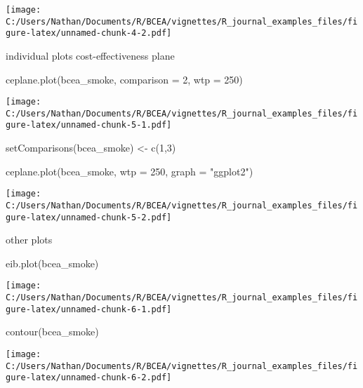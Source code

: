 \documentclass[
]{article}
\newenvironment{Shaded}{\begin{snugshade}}{\end{snugshade}}
\newcommand{\AttributeTok}[1]{\textcolor[rgb]{0.77,0.63,0.00}{#1}}
\newcommand{\DecValTok}[1]{\textcolor[rgb]{0.00,0.00,0.81}{#1}}
\newcommand{\FunctionTok}[1]{\textcolor[rgb]{0.00,0.00,0.00}{#1}}
\newcommand{\NormalTok}[1]{#1}
\newcommand{\OtherTok}[1]{\textcolor[rgb]{0.56,0.35,0.01}{#1}}
\newcommand{\StringTok}[1]{\textcolor[rgb]{0.31,0.60,0.02}{#1}}
\begin{document}
\texttt{[image: C:/Users/Nathan/Documents/R/BCEA/vignettes/R\_journal\_examples\_files/figure-latex/unnamed-chunk-4-2.pdf]}

individual plots cost-effectiveness plane

\begin{Shaded}
\begin{Highlighting}[]
\FunctionTok{ceplane.plot}\NormalTok{(bcea\_smoke, }\AttributeTok{comparison =} \DecValTok{2}\NormalTok{, }\AttributeTok{wtp =} \DecValTok{250}\NormalTok{)}
\end{Highlighting}
\end{Shaded}

\texttt{[image: C:/Users/Nathan/Documents/R/BCEA/vignettes/R\_journal\_examples\_files/figure-latex/unnamed-chunk-5-1.pdf]}

\begin{Shaded}
\begin{Highlighting}[]

\FunctionTok{setComparisons}\NormalTok{(bcea\_smoke) }\OtherTok{\textless{}{-}} \FunctionTok{c}\NormalTok{(}\DecValTok{1}\NormalTok{,}\DecValTok{3}\NormalTok{)}

\FunctionTok{ceplane.plot}\NormalTok{(bcea\_smoke, }\AttributeTok{wtp =} \DecValTok{250}\NormalTok{, }\AttributeTok{graph =} \StringTok{"ggplot2"}\NormalTok{)}
\end{Highlighting}
\end{Shaded}

\texttt{[image: C:/Users/Nathan/Documents/R/BCEA/vignettes/R\_journal\_examples\_files/figure-latex/unnamed-chunk-5-2.pdf]}

other plots

\begin{Shaded}
\begin{Highlighting}[]
\FunctionTok{eib.plot}\NormalTok{(bcea\_smoke)}
\end{Highlighting}
\end{Shaded}

\texttt{[image: C:/Users/Nathan/Documents/R/BCEA/vignettes/R\_journal\_examples\_files/figure-latex/unnamed-chunk-6-1.pdf]}

\begin{Shaded}
\begin{Highlighting}[]

\FunctionTok{contour}\NormalTok{(bcea\_smoke)}
\end{Highlighting}
\end{Shaded}

\texttt{[image: C:/Users/Nathan/Documents/R/BCEA/vignettes/R\_journal\_examples\_files/figure-latex/unnamed-chunk-6-2.pdf]}
\end{document}
